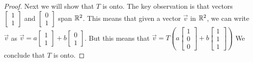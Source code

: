\documentclass{ximera}
\begin{document}
\begin{example}
\begin{proof}
Next we will show that $T$ is onto.  
The key observation is that vectors $\begin{bmatrix}1\\1\end{bmatrix}$ and $\begin{bmatrix}0\\1\end{bmatrix}$ span $\mathbb{R}^2$.  %
This means that given a vector $\vec{v}$ in $\mathbb{R}^2$, we can write $\vec{v}$ as $\vec{v}=a\begin{bmatrix}1\\1\end{bmatrix}+b\begin{bmatrix}0\\1\end{bmatrix}$.  But this means that $\vec{v}=T\left(a\begin{bmatrix}1\\0\\0\end{bmatrix}+b\begin{bmatrix}1\\1\\1\end{bmatrix}\right)$  We conclude that $T$ is onto. 
\end{proof}
\end{example}
\end{document}

